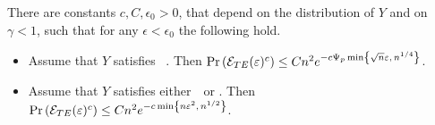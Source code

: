 \documentclass[times,sort&compress,3p]{elsarticle}
\begin{document}
\begin{theorem}
        \label{thm:main_tyler}
        There are constants $c,C,\epsilon_0>0$, that depend on the distribution of $Y$ and on $\gamma<1$, such that for any $\epsilon<\epsilon_0$ the following hold.
       \begin{itemize}
            \item 
            Assume that $Y$ satisfies ~\AssumLC. Then 
            $
            \Pr\left( \mathcal{E}_{TE}(\varepsilon)^c  \right) \le Cn^2 e^{-c \Psi_p\min\left\{ \sqrt{n}\varepsilon,\,  n^{1/4}\right\} } 
            $.
            \item 
            Assume that $Y$ satisfies either~\AssumIndep~or \AssumCCPSB. Then
            $
            \Pr\left( \mathcal{E}_{TE}(\varepsilon)^c \right) \le Cn^2 e^{-c \min\left\{ n\varepsilon^2,\, n^{1/2}\right\}} 
            $.
        \end{itemize}
\end{theorem}
%
%
%
%
\end{document}
